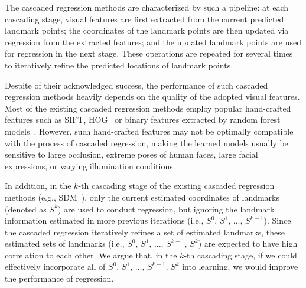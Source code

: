 \documentclass[journal]{IEEEtran}
\begin{document}
The cascaded regression methods are characterized by such a pipeline: at each cascading stage, visual features are first extracted from the current predicted landmark points; the coordinates of the landmark points are then updated via regression from the extracted features; and the updated landmark points are used for regression in the next stage. These operations are repeated for several times to iteratively refine the predicted locations of landmark points.

Despite of their acknowledged success, the performance of such cascaded regression methods heavily depends on the quality of the adopted visual features. Most of the existing cascaded regression methods employ popular hand-crafted features such as SIFT, HOG~\cite{sdm,cfss} or binary features extracted by random forest models~\cite{lbf}. However, such hand-crafted features may not be optimally compatible with the process of cascaded regression, making the learned models usually be sensitive to large occlusion, extreme poses of human faces, large facial expressions, or varying illumination conditions.

In addition, in the $k$-th cascading stage of the existing cascaded regression methods (e.g., SDM~\cite{sdm}), only the current estimated coordinates of landmarks (denoted as $S^k$) are used to conduct regression, but ignoring the landmark information estimated in more previous iterations (i.e., $S^0$, $S^1$, ..., $S^{k-1}$). Since the cascaded regression iteratively refines a set of estimated landmarks, these estimated sets of landmarks (i.e., $S^0$, $S^1$, ..., $S^{k-1}$, $S^{k}$) are expected to have high correlation to each other. We argue that, in the $k$-th cascading stage, if we could effectively incorporate all of $S^0$, $S^1$, ..., $S^{k-1}$, $S^{k}$ into learning, we would improve the performance of regression.
\end{document}
